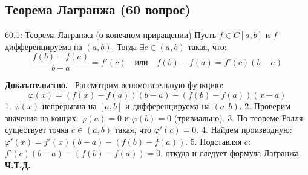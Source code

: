 \documentclass[a4paper,12pt]{article}
\newcommand{\myproof}{\textbf{Доказательство.}\ }
\begin{document}
	
	
	
	\newpage
	\subsection{Теорема Лагранжа (60 вопрос)}
	
	\begin{theorembox}{60.1: Теорема Лагранжа (о конечном приращении)}
		Пусть $f \in C[a, b]$ и $f$ дифференцируема на $(a, b)$. Тогда $\exists c \in (a, b)$ такая, что:
		$$ \frac{f(b) - f(a)}{b - a} = f'(c) \quad \text{или} \quad f(b) - f(a) = f'(c)(b - a) $$
	\end{theorembox}
	
	\myproof
	Рассмотрим вспомогательную функцию:
	$$ \varphi(x) = (f(x) - f(a))(b - a) - (f(b) - f(a))(x - a) $$
	1. $\varphi(x)$ непрерывна на $[a, b]$ и дифференцируема на $(a, b)$.
	2. Проверим значения на концах: $\varphi(a) = 0$ и $\varphi(b) = 0$ (тривиально).
	3. По теореме Ролля существует точка $c \in (a, b)$ такая, что $\varphi'(c) = 0$.
	4. Найдем производную: $\varphi'(x) = f'(x)(b - a) - (f(b) - f(a))$.
	5. Подставляя $c$: $f'(c)(b - a) - (f(b) - f(a)) = 0$, откуда и следует формула Лагранжа. \textbf{Ч.Т.Д.}
	
	\begin{center}
	\end{center}
	
\end{document}
